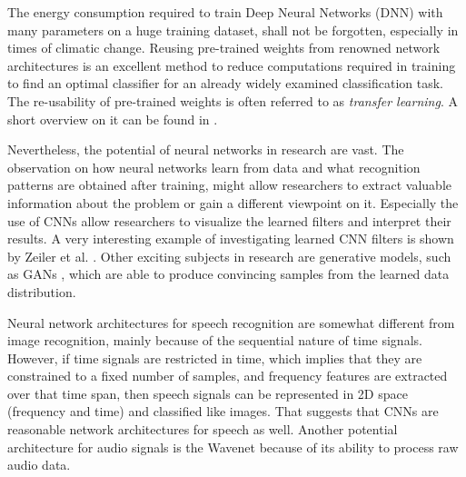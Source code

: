The energy consumption required to train Deep Neural Networks (DNN) with many parameters on a huge training dataset, shall not be forgotten, especially in times of climatic change.
Reusing pre-trained weights from renowned network architectures is an excellent method to reduce computations required in training to find an optimal classifier for an already widely examined classification task.
The re-usability of pre-trained weights is often referred to as \emph{transfer learning}.
A short overview on it can be found in \cite{TransferLearning}.

Nevertheless, the potential of neural networks in research are vast.
The observation on how neural networks learn from data and what recognition patterns are obtained after training, might allow researchers to extract valuable information about the problem or gain a different viewpoint on it.
Especially the use of CNNs allow researchers to visualize the learned filters and interpret their results.
A very interesting example of investigating learned CNN filters is shown by Zeiler et al. \cite{Zeiler2013}.
Other exciting subjects in research are generative models, such as GANs \cite{Goodfellow2014}, which are able to produce convincing samples from the learned data distribution.

Neural network architectures for speech recognition are somewhat different from image recognition, mainly because of the sequential nature of time signals.
However, if time signals are restricted in time, which implies that they are constrained to a fixed number of samples, and frequency features are extracted over that time span, then speech signals can be represented in 2D space (frequency and time) and classified like images.
That suggests that CNNs are reasonable network architectures for speech as well.
Another potential architecture for audio signals is the Wavenet \cite{Oord2016} because of its ability to process raw audio data.